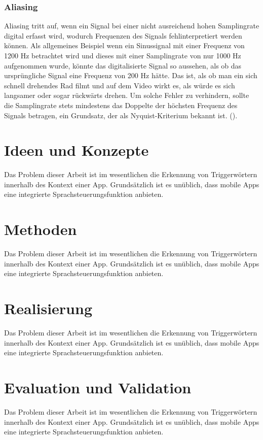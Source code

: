 \documentclass[11pt,a4paper]{article}
\begin{document}
\subsubsection{Aliasing}
Aliasing tritt auf, wenn ein Signal bei einer nicht ausreichend hohen Samplingrate digital erfasst 
wird, wodurch Frequenzen des Signals fehlinterpretiert werden können. Als allgemeines Beispiel wenn 
ein Sinussignal mit einer Frequenz von 1200 Hz betrachtet wird und dieses mit einer Samplingrate 
von nur 1000 Hz aufgenommen wurde, könnte das digitalisierte Signal so aussehen, als ob das 
ursprüngliche Signal eine Frequenz von 200 Hz hätte. Das ist, als ob man ein sich schnell 
drehendes Rad filmt und auf dem Video wirkt es, als würde es sich langsamer oder sogar rückwärts 
drehen. Um solche Fehler zu verhindern, sollte die Samplingrate stets mindestens das 
Doppelte der höchsten Frequenz des Signals betragen, ein Grundsatz, der als Nyquist-Kriterium 
bekannt ist. (\cite[]{weitz2023fourier}).


\newpage
\section{Ideen und Konzepte}
Das Problem dieser Arbeit ist im wesentlichen die Erkennung von Triggerwörtern innerhalb
des Kontext einer App. Grundsätzlich ist es unüblich, dass mobile Apps eine
integrierte Sprachsteuerungsfunktion anbieten.


\newpage
\section{Methoden}
Das Problem dieser Arbeit ist im wesentlichen die Erkennung von Triggerwörtern innerhalb
des Kontext einer App. Grundsätzlich ist es unüblich, dass mobile Apps eine
integrierte Sprachsteuerungsfunktion anbieten.


\newpage
\section{Realisierung}
Das Problem dieser Arbeit ist im wesentlichen die Erkennung von Triggerwörtern innerhalb
des Kontext einer App. Grundsätzlich ist es unüblich, dass mobile Apps eine
integrierte Sprachsteuerungsfunktion anbieten.


\newpage
\section{Evaluation und Validation}
Das Problem dieser Arbeit ist im wesentlichen die Erkennung von Triggerwörtern innerhalb
des Kontext einer App. Grundsätzlich ist es unüblich, dass mobile Apps eine
integrierte Sprachsteuerungsfunktion anbieten.
\end{document}
